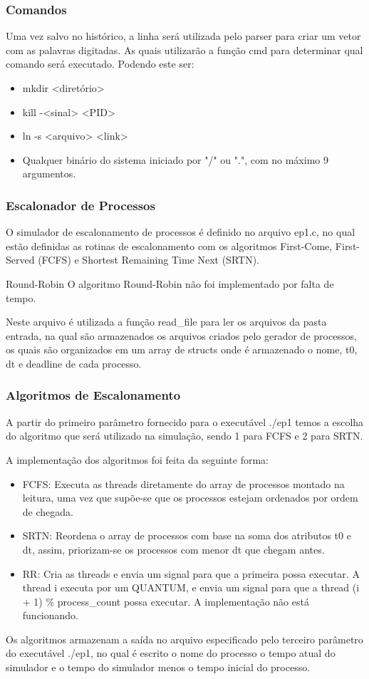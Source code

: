 \documentclass{beamer}
\begin{document}
\begin{frame}
\frametitle{Comandos}

Uma vez salvo no histórico, a linha será utilizada pelo parser para criar um vetor com as palavras digitadas. As quais
utilizarão a função cmd para determinar qual comando será executado. Podendo este ser:

\begin{itemize}
    \item mkdir <diretório>
    \item kill -<sinal> <PID>
    \item ln -s <arquivo> <link>
    \item Qualquer binário do sistema iniciado por "/" ou ".", com no máximo 9 argumentos.
\end{itemize}
\end{frame}

\begin{frame}
\frametitle{Escalonador de Processos}
O simulador de escalonamento de processos é definido no arquivo ep1.c, no qual estão definidas as rotinas de
    escalonamento com os algoritmos First-Come, First-Served (FCFS) e Shortest Remaining Time Next (SRTN).

\begin{block}{Round-Robin}
O algoritmo Round-Robin não foi implementado por falta de tempo.
\end{block}

Neste arquivo é utilizada a função read\_file para ler os arquivos da pasta entrada, na qual são armazenados os arquivos
criados pelo gerador de processos, os quais são organizados em um array de structs onde é armazenado o nome, t0, dt e
    deadline de cada processo.
\end{frame}

\begin{frame}
\frametitle{Algoritmos de Escalonamento}
A partir do primeiro parâmetro fornecido para o executável ./ep1 temos a escolha do algoritmo que será utilizado na
    simulação, sendo 1 para FCFS e 2 para SRTN.

A implementação dos algoritmos foi feita da seguinte forma:
\begin{itemize}
    \item FCFS: Executa as threads diretamente do array de processos montado na leitura, uma vez que supõe-se que os processos estejam ordenados por ordem de chegada.
    \item SRTN: Reordena o array de processos com base na soma dos atributos t0 e dt, assim, priorizam-se os processos
        com menor dt que chegam antes.
    \item RR: Cria as threads e envia um signal para que a primeira possa executar. A thread i executa por um QUANTUM, e envia um signal para que a thread (i + 1) \% process_count possa executar. A implementação não está funcionando. 
\end{itemize}

Os algoritmos armazenam a saída no arquivo especificado pelo terceiro parâmetro do executável ./ep1, no qual é escrito o
nome do processo o tempo atual do simulador e o tempo do simulador menos o tempo inicial do processo.

\end{frame}
\end{document}
